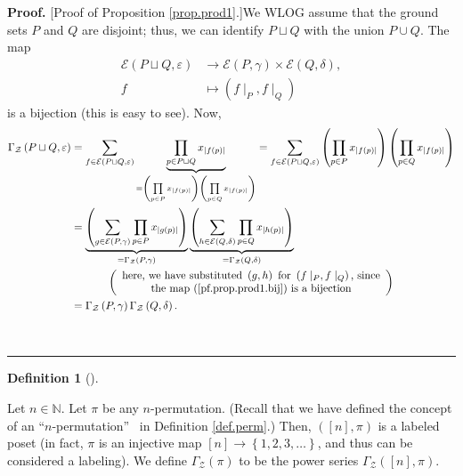 \documentclass[numbers=enddot,12pt,final,onecolumn,notitlepage]{scrartcl}%
\theoremstyle{definition}
\newtheorem{defi}[theo]{Definition}
\newenvironment{definition}[1][]
{\begin{defi}[#1]\begin{leftbar}}
{\end{leftbar}\end{defi}}
\newenvironment{proof}[1][Proof]{\noindent\textbf{#1.} }{\ \rule{0.5em}{0.5em}}
\let\sumnonlimits\sum
\let\prodnonlimits\prod
\renewcommand{\sum}{\sumnonlimits\limits}
\renewcommand{\prod}{\prodnonlimits\limits}
\begin{document}
\begin{proof}
[Proof of Proposition \ref{prop.prod1}.]We WLOG assume that the ground sets
$P$ and $Q$ are disjoint; thus, we can identify $P\sqcup Q$ with the union
$P\cup Q$. The map%
\begin{align}
\mathcal{E}\left(  P\sqcup Q,\varepsilon\right)   &  \rightarrow
\mathcal{E}\left(  P,\gamma\right)  \times\mathcal{E}\left(  Q,\delta\right)
,\nonumber\\
f  &  \mapsto\left(  f\mid_{P},f\mid_{Q}\right)  \label{pf.prop.prod1.bij}%
\end{align}
is a bijection (this is easy to see). Now,%
\begin{align*}
\Gamma_{\mathcal{Z}}\left(  P\sqcup Q,\varepsilon\right)   &  =\sum
_{f\in\mathcal{E}\left(  P\sqcup Q,\varepsilon\right)  }\underbrace{\prod
_{p\in P\sqcup Q}x_{\left\vert f\left(  p\right)  \right\vert }}_{=\left(
\prod_{p\in P}x_{\left\vert f\left(  p\right)  \right\vert }\right)  \left(
\prod_{p\in Q}x_{\left\vert f\left(  p\right)  \right\vert }\right)  }%
=\sum_{f\in\mathcal{E}\left(  P\sqcup Q,\varepsilon\right)  }\left(
\prod_{p\in P}x_{\left\vert f\left(  p\right)  \right\vert }\right)  \left(
\prod_{p\in Q}x_{\left\vert f\left(  p\right)  \right\vert }\right) \\
&  =\underbrace{\left(  \sum_{g\in\mathcal{E}\left(  P,\gamma\right)  }%
\prod_{p\in P}x_{\left\vert g\left(  p\right)  \right\vert }\right)
}_{=\Gamma_{\mathcal{Z}}\left(  P,\gamma\right)  }\underbrace{\left(
\sum_{h\in\mathcal{E}\left(  Q,\delta\right)  }\prod_{p\in Q}x_{\left\vert
h\left(  p\right)  \right\vert }\right)  }_{=\Gamma_{\mathcal{Z}}\left(
Q,\delta\right)  }\\
&  \ \ \ \ \ \ \ \ \ \ \left(
\begin{array}
[c]{c}%
\text{here, we have substituted }\left(  g,h\right)  \text{ for }\left(
f\mid_{P},f\mid_{Q}\right)  \text{, since}\\
\text{the map (\ref{pf.prop.prod1.bij}) is a bijection}%
\end{array}
\right) \\
&  =\Gamma_{\mathcal{Z}}\left(  P,\gamma\right)  \Gamma_{\mathcal{Z}}\left(
Q,\delta\right)  .
\end{align*}

\end{proof}

\begin{definition}
Let $n\in\mathbb{N}$. Let $\pi$ be any $n$-permutation. (Recall that we have
defined the concept of an \textquotedblleft$n$-permutation\textquotedblright%
\ in Definition \ref{def.perm}.) Then, $\left(  \left[  n\right]  ,\pi\right)
$ is a labeled poset (in fact, $\pi$ is an injective map $\left[  n\right]
\rightarrow\left\{  1,2,3,\ldots\right\}  $, and thus can be considered a
labeling). We define $\Gamma_{\mathcal{Z}}\left(  \pi\right)  $ to be the
power series $\Gamma_{\mathcal{Z}}\left(  \left[  n\right]  ,\pi\right)  $.
\end{definition}
\end{document}
